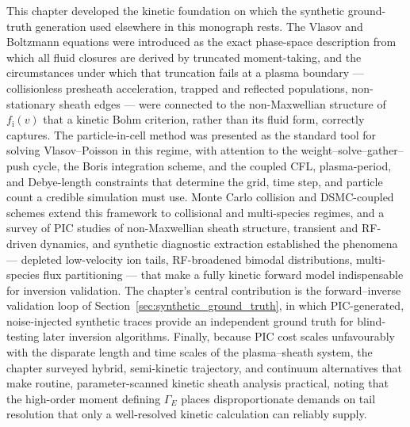 This chapter developed the kinetic foundation on which the synthetic ground-truth generation used elsewhere in this monograph rests. The Vlasov and Boltzmann equations were introduced as the exact phase-space description from which all fluid closures are derived by truncated moment-taking, and the circumstances under which that truncation fails at a plasma boundary --- collisionless presheath acceleration, trapped and reflected populations, non-stationary sheath edges --- were connected to the non-Maxwellian structure of $f_{\mathrm{i}}(v)$ that a kinetic Bohm criterion, rather than its fluid form, correctly captures. The particle-in-cell method was presented as the standard tool for solving Vlasov--Poisson in this regime, with attention to the weight--solve--gather--push cycle, the Boris integration scheme, and the coupled CFL, plasma-period, and Debye-length constraints that determine the grid, time step, and particle count a credible simulation must use. Monte Carlo collision and DSMC-coupled schemes extend this framework to collisional and multi-species regimes, and a survey of PIC studies of non-Maxwellian sheath structure, transient and RF-driven dynamics, and synthetic diagnostic extraction established the phenomena --- depleted low-velocity ion tails, RF-broadened bimodal distributions, multi-species flux partitioning --- that make a fully kinetic forward model indispensable for inversion validation. The chapter's central contribution is the forward--inverse validation loop of Section~\ref{sec:synthetic_ground_truth}, in which PIC-generated, noise-injected synthetic traces provide an independent ground truth for blind-testing later inversion algorithms. Finally, because PIC cost scales unfavourably with the disparate length and time scales of the plasma--sheath system, the chapter surveyed hybrid, semi-kinetic trajectory, and continuum alternatives that make routine, parameter-scanned kinetic sheath analysis practical, noting that the high-order moment defining $\Gamma_{E}$ places disproportionate demands on tail resolution that only a well-resolved kinetic calculation can reliably supply.
